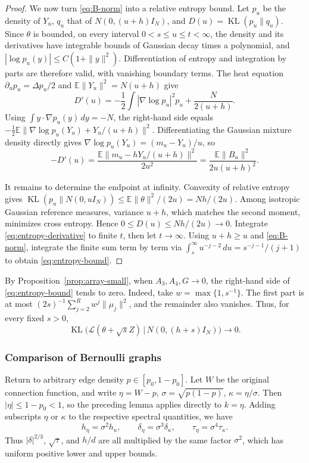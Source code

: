 \documentclass[11pt,reqno]{amsart}
\numberwithin{equation}{section}
\theoremstyle{definition}
\theoremstyle{remark}
\theoremstyle{definition}
\DeclareMathOperator{\KL}{KL}
\begin{document}
\begin{proof}
We now turn \eqref{eq:B-norm} into a relative entropy bound.
Let $p_u$ be the density of $Y_u$, $q_u$ that of $N(0,(u+h)I_N)$, and
$D(u)=\KL(p_u\|q_u)$.
Since $\theta$ is bounded, on every interval $0<s\le u\le t<\infty$,
the density and its derivatives have integrable bounds of Gaussian decay times a polynomial, and
$|\log p_u(y)|\le C(1+\|y\|^2)$.
Differentiation of entropy and integration by parts are therefore valid, with vanishing boundary terms.
The heat equation $\partial_up_u=\Delta p_u/2$ and
$\mathbb E\|Y_u\|^2=N(u+h)$ give
\[
 D'(u)=-\frac12\int|\nabla\log p_u|^2p_u+\frac{N}{2(u+h)}.
\]
Using $\int y\cdot\nabla p_u(y)\,dy=-N$, the right-hand side equals
$-\frac12\mathbb E\|\nabla\log p_u(Y_u)+Y_u/(u+h)\|^2$.
Differentiating the Gaussian mixture density directly gives
$\nabla\log p_u(Y_u)=(m_u-Y_u)/u$, so
\begin{equation}\label{eq:entropy-derivative}
 -D'(u)=\frac{\mathbb E\|m_u-hY_u/(u+h)\|^2}{2u^2}
 =\frac{\mathbb E\|B_u\|^2}{2u(u+h)^2}.
\end{equation}

It remains to determine the endpoint at infinity. Convexity of relative entropy gives
$\KL(p_u\|N(0,uI_N))\le\mathbb E\|\theta\|^2/(2u)=Nh/(2u)$.
Among isotropic Gaussian reference measures, variance $u+h$, which matches the second moment, minimizes cross entropy.
Hence $0\le D(u)\le Nh/(2u)\to0$.
Integrate \eqref{eq:entropy-derivative} to finite $t$, then let $t\to\infty$.
Using $u+h\ge u$ and \eqref{eq:B-norm}, integrate the finite sum term by term via
$\int_s^\infty u^{-j-2}\,du=s^{-j-1}/(j+1)$ to obtain \eqref{eq:entropy-bound}.
\end{proof}

By Proposition~\ref{prop:array-small}, when $A_3,A_4,G\to0$,
the right-hand side of \eqref{eq:entropy-bound} tends to zero.
Indeed, take $w=\max\{1,s^{-1}\}$. The first part is at most
$(2s)^{-1}\sum_{j=2}^Rw^j\|\mu_j\|^2$, and the remainder also vanishes.
Thus, for every fixed $s>0$,
\begin{equation}\label{eq:gaussian-small}
 \KL\bigl(\mathcal L(\theta+\sqrt sZ)\,|\,N(0,(h+s)I_N)\bigr)\longrightarrow0.
\end{equation}

\subsubsection{Comparison of Bernoulli graphs}\label{sec:transfer}
Return to arbitrary edge density $p\in[p_0,1-p_0]$.
Let $W$ be the original connection function, and write
$\eta=W-p$, $\sigma=\sqrt{p(1-p)}$, $\kappa=\eta/\sigma$.
Then $|\eta|\le1-p_0<1$, so the preceding lemma applies directly to $k=\eta$.
Adding subscripts $\eta$ or $\kappa$ to the respective spectral quantities, we have
\begin{equation}\label{eq:rescale}
 h_\eta=\sigma^2h_\kappa,\qquad
 \delta_\eta=\sigma^3\delta_\kappa,\qquad
 \tau_\eta=\sigma^4\tau_\kappa.
\end{equation}
Thus $|\delta|^{2/3}$, $\sqrt\tau$, and $h/d$ are all multiplied by the same factor $\sigma^2$,
which has uniform positive lower and upper bounds.
\end{document}
